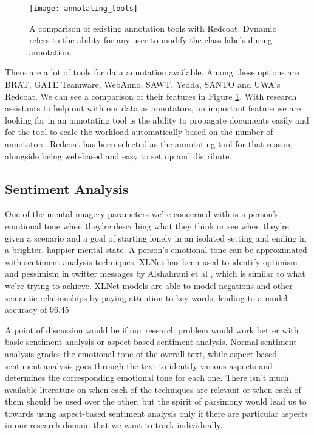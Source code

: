 \documentclass[12pt, a4paper]{article}
\begin{document}
\begin{figure}
	\texttt{[image: annotating\_tools]}
	\caption{A comparison of existing annotation tools with Redcoat. Dynamic refers to the ability for any user to modify the class labels during annotation.}
	\label{annot_table}
\end{figure}

There are a lot of tools for data annotation available. Among these options are BRAT, GATE Teamware, WebAnno, SAWT, Yedda, SANTO and UWA's Redcoat. We can see a comparison of their features in Figure \ref{annot_table}. With research assistants to help out with our data as annotators, an important feature we are looking for in an annotating tool is the ability to propagate documents easily and for the tool to scale the workload automatically based on the number of annotators.  Redcoat \cite{stewart-etal-2019-redcoat} has been selected as the annotating tool for that reason, alongside being web-based and easy to set up and distribute. 

\subsection{Sentiment Analysis}
One of the mental imagery parameters we're concerned with is a person's emotional tone when they're describing what they think or see when they're given a scenario and a goal of starting lonely in an isolated setting and ending in a brighter, happier mental state. A person's emotional tone can be approximated with sentiment analysis techniques. XLNet has been used to identify optimism and pessimism in twitter messages by Alshahrani et al \cite{alshahrani2019xlnet}, which is similar to what we're trying to achieve. XLNet models are able to model negations and other semantic relationships by paying attention to key words, leading to a model accuracy of 96.45%

A point of discussion would be if our research problem would work better with basic sentiment analysis or aspect-based sentiment analysis. Normal sentiment analysis grades the emotional tone of the overall text, while aspect-based sentiment analysis goes through the text to identify various aspects and determines the corresponding emotional tone for each one. There isn't much available literature on when each of the techniques are relevant or when each of them should be used over the other, but the spirit of parsimony would lead us to towards using aspect-based sentiment analysis only if there are particular aspects in our research domain that we want to track individually. 
\end{document}

